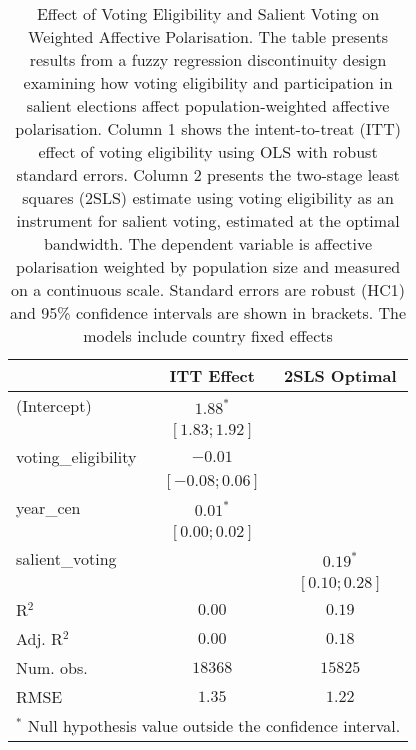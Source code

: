 
\begin{table}
\begin{center}
\begin{tabular}{l c c}
\hline
 & ITT Effect & 2SLS Optimal \\
\hline
(Intercept)         & $1.88^{*}$       &                 \\
                    & $ [ 1.83; 1.92]$ &                 \\
voting\_eligibility & $-0.01$          &                 \\
                    & $ [-0.08; 0.06]$ &                 \\
year\_cen           & $0.01^{*}$       &                 \\
                    & $ [ 0.00; 0.02]$ &                 \\
salient\_voting     &                  & $0.19^{*}$      \\
                    &                  & $ [0.10; 0.28]$ \\
\hline
R$^2$               & $0.00$           & $0.19$          \\
Adj. R$^2$          & $0.00$           & $0.18$          \\
Num. obs.           & $18368$          & $15825$         \\
RMSE                & $1.35$           & $1.22$          \\
\hline
\multicolumn{3}{l}{\scriptsize{$^*$ Null hypothesis value outside the confidence interval.}}
\end{tabular}
\caption{Effect of Voting Eligibility and Salient Voting on Weighted Affective Polarisation. The table presents results from a fuzzy regression discontinuity design examining how voting eligibility and participation in salient elections affect population-weighted affective polarisation. Column 1 shows the intent-to-treat (ITT) effect of voting eligibility using OLS with robust standard errors. Column 2 presents the two-stage least squares (2SLS) estimate using voting eligibility as an instrument for salient voting, estimated at the optimal bandwidth. The dependent variable is affective polarisation weighted by population size and measured on a continuous scale. Standard errors are robust (HC1) and 95\% confidence intervals are shown in brackets. The models include country fixed effects}
\label{table:main_results_w}
\end{center}
\end{table}
